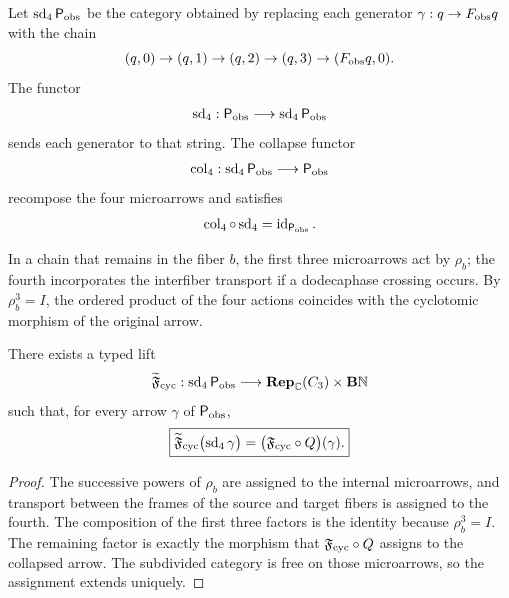 Let \(\operatorname{sd}_4\mathsf P_{\rm obs}\) be the category obtained by
replacing each generator
\(\gamma:q\to F_{\rm obs}q\) with the chain
\begin{equation}
 (q,0)\to(q,1)\to(q,2)\to(q,3)\to(F_{\rm obs}q,0).
 \label{p12-83-c1-s12:eq:u006c-cadena-subdivision}
\end{equation}
The functor
\[
 \operatorname{sd}_4:
 \mathsf P_{\rm obs}\longrightarrow
 \operatorname{sd}_4\mathsf P_{\rm obs}
\]
sends each generator to that string. The collapse functor
\[
 \operatorname{col}_4:
 \operatorname{sd}_4\mathsf P_{\rm obs}
 \longrightarrow\mathsf P_{\rm obs}
\]
recompose the four microarrows and satisfies
\begin{equation}
 \operatorname{col}_4\circ\operatorname{sd}_4
 =\operatorname{id}_{\mathsf P_{\rm obs}}.
 \label{p12-83-c1-s12:eq:u006c-colapso}
\end{equation}

In a chain that remains in the fiber \(b\), the first three
microarrows act by \(\rho_b\); the fourth incorporates the interfiber transport
if a dodecaphase crossing occurs. By \(\rho_b^3=I\), the ordered product
of the four actions coincides with the cyclotomic morphism of the
original arrow.

\begin{proposition}
\label{p12-83-c1-s12:prop:u006c-invariancia-ciclotomica}
There exists a typed lift
\[
 \widetilde{\mathfrak F}_{\rm cyc}:
 \operatorname{sd}_4\mathsf P_{\rm obs}
 \longrightarrow
 \mathbf{Rep}_{\mathbb C}(C_3)\times\mathbf B\mathbb N
\]
such that, for every arrow \(\gamma\) of
\(\mathsf P_{\rm obs}\),
\begin{equation}
 \boxed{
 \widetilde{\mathfrak F}_{\rm cyc}
 \bigl(\operatorname{sd}_4\gamma\bigr)
 =
 \bigl(\mathfrak F_{\rm cyc}\circ Q\bigr)(\gamma).}
 \label{p12-83-c1-s12:eq:u006c-invariancia-ciclotomica}
\end{equation}
\end{proposition}

\begin{proof}
The successive powers of
\(\rho_b\) are assigned to the internal microarrows, and transport between the frames of the
source and target fibers is assigned to the fourth. The composition of the first three factors is the
identity because \(\rho_b^3=I\). The remaining factor is exactly the
morphism that \(\mathfrak F_{\rm cyc}\circ Q\) assigns to the
collapsed arrow. The subdivided category is free on those microarrows, so
the assignment extends uniquely.
\end{proof}

